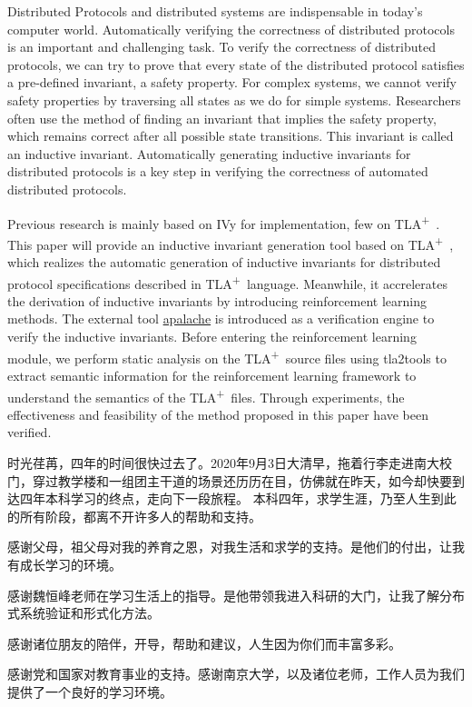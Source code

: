 \documentclass[
    type = bachelor,
    degree = academic,
    twoside,
    fontset = win,
    decl-page
]
{njuthesis}
\newcommand{\TLA}{TLA\textsuperscript{+}\ }
\begin{document}
\begin{abstract*}
    Distributed Protocols and distributed systems are indispensable in today's computer world. Automatically verifying the correctness of distributed protocols is an important and challenging task.
    To verify the correctness of distributed protocols, we can try to prove that every state of the distributed protocol satisfies a pre-defined invariant, a safety property.
    For complex systems, we cannot verify safety properties by traversing all states as we do for simple systems.
    Researchers often use the method of finding an invariant that implies the safety property, which remains correct after all possible state transitions. This invariant is called an inductive invariant.
    Automatically generating inductive invariants for distributed protocols is a key step in verifying the correctness of automated distributed protocols.

    Previous research is mainly based on IVy for implementation, few on \TLA. 
    This paper will provide an inductive invariant generation tool based on \TLA, which realizes the automatic generation of inductive invariants for distributed protocol specifications described in \TLA language.
    Meanwhile, it accrelerates the derivation of inductive invariants by introducing reinforcement learning methods.
    The external tool \href{https://apalache.informal.systems/}{apalache} is introduced as a verification engine to verify the inductive invariants.
    Before entering the reinforcement learning module, we perform static analysis on the \TLA source files using tla2tools to extract semantic information for the reinforcement learning framework to understand the semantics of the \TLA files.
    Through experiments, the effectiveness and feasibility of the method proposed in this paper have been verified.
\end{abstract*}

\tableofcontents

\mainmatter






\printbibliography

\begin{acknowledgement}
时光荏苒，四年的时间很快过去了。2020年9月3日大清早，拖着行李走进南大校门，穿过教学楼和一组团主干道的场景还历历在目，仿佛就在昨天，如今却快要到达四年本科学习的终点，走向下一段旅程。
本科四年，求学生涯，乃至人生到此的所有阶段，都离不开许多人的帮助和支持。

感谢父母，祖父母对我的养育之恩，对我生活和求学的支持。是他们的付出，让我有成长学习的环境。

感谢魏恒峰老师在学习生活上的指导。是他带领我进入科研的大门，让我了解分布式系统验证和形式化方法。

感谢诸位朋友的陪伴，开导，帮助和建议，人生因为你们而丰富多彩。

感谢党和国家对教育事业的支持。感谢南京大学，以及诸位老师，工作人员为我们提供了一个良好的学习环境。

\end{acknowledgement}
\end{document}
